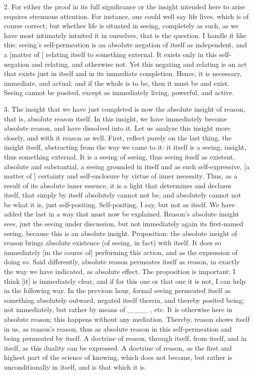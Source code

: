 2. For either the proof in its full significance
or the insight intended here to arise
requires strenuous attention.
For instance, one could well say life lives,
which is of course correct;
but whether life is situated in seeing,
completely as such,
as we have most intimately intuited it in ourselves,
that is the question.
I handle it like this:
seeing’s self-permeation is
an absolute negation of itself as independent,
and a [matter of ] relating itself to something external.
It exists only in this self-negation and relating,
and otherwise not.
Yet this negating and relating is
an act that exists just in itself
and in its immediate completion.
Hence, it is necessary, immediate, and actual;
and if the whole is to be,
then it must be and exist.
Seeing cannot be posited,
except as immediately living, powerful, and active.

3. The insight that we have just completed is
now the absolute insight of reason,
that is, absolute reason itself.
In this insight, we have
immediately become absolute reason,
and have dissolved into it.
Let us analyze this insight more closely,
and with it reason as well.
First, reflect purely on the last thing,
the insight itself, abstracting from the way we came to it:
it itself is a seeing, insight,
thus something external.
It is a seeing of seeing,
thus seeing itself as existent,
absolute and substantial,
a seeing grounded in itself
and as such self-expressive,
[a matter of ] certainty and self-enclosure
by virtue of inner necessity.
Thus, as a result of its absolute inner essence,
it is a light that determines and declares itself,
that simply by itself absolutely cannot not be,
and absolutely cannot not be what it is,
just self-positing.
Self-positing, I say, but not as itself.
We have added the last in a way that must now be explained.
Reason’s absolute insight sees,
just the seeing under discussion,
but not immediately again its first-named seeing,
because this is an absolute insight.
Proposition: the absolute insight of reason
brings absolute existence (of seeing, in fact) with itself.
It does so immediately [in the course of] performing this action,
and as the expression of doing so.
Said differently, absolute reason permeates itself as reason,
in exactly the way we have indicated, as absolute effect.
The proposition is important:
I think [it] is immediately clear,
and if for this one or that one it is not,
I can help in the following way.
In the previous hour,
formal seeing permeated itself
as something absolutely outward,
negated itself therein,
and thereby posited being;
not immediately, but rather by means of ____ , etc.
It is otherwise here in absolute reason;
this happens without any mediation.
Thereby, reason shows itself in us, as reason’s reason,
thus as absolute reason in this self-permeation
and being permeated by itself.
A doctrine of reason,
through itself, from itself, and in itself,
as this duality can be expressed.
A doctrine of reason,
as the first and highest part
of the science of knowing,
which does not become,
but rather is unconditionally in itself,
and is that which it is.

